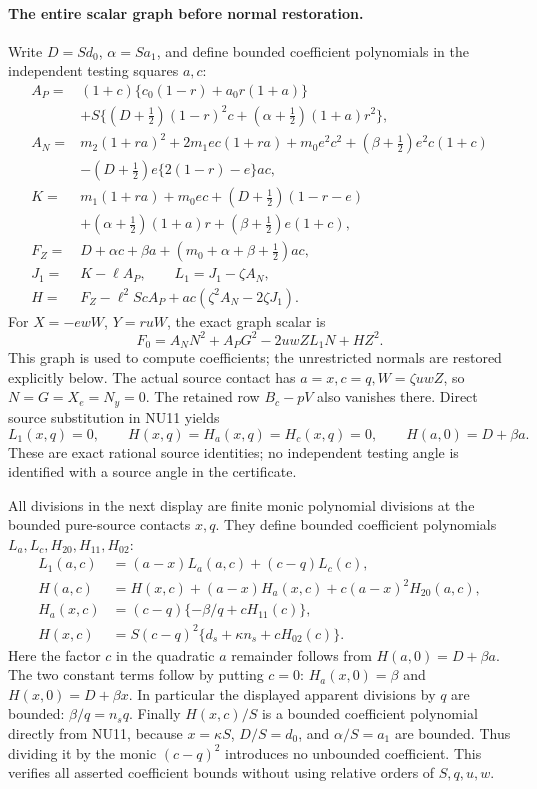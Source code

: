 \paragraph{The entire scalar graph before normal restoration.}
Write $D=Sd_0$, $\alpha=Sa_1$, and define bounded coefficient
polynomials in the independent testing squares $a,c$:
\[
\begin{split}
 A_P={}&(1+c)\{c_0(1-r)+a_0r(1+a)\}\\
 &+S\{(D+\tfrac12)(1-r)^2c
                  +(\alpha+\tfrac12)(1+a)r^2\},\\
 A_N={}&m_2(1+ra)^2+2m_1ec(1+ra)+m_0e^2c^2
                  +(\beta+\tfrac12)e^2c(1+c)\\
 &-(D+\tfrac12)e\{2(1-r)-e\}ac,\\
 K={}&m_1(1+ra)+m_0ec+(D+\tfrac12)(1-r-e)\\
 &+(\alpha+\tfrac12)(1+a)r+(\beta+\tfrac12)e(1+c),\\
 F_Z={}&D+\alpha c+\beta a+(m_0+\alpha+\beta+\tfrac12)ac,\\
 J_1={}&K-\ell A_P,\qquad L_1=J_1-\zeta A_N,\\
 H={}&F_Z-\ell^2ScA_P+ac(\zeta^2A_N-2\zeta J_1).
\end{split}\tag{NU11}
\]
For $X=-ewW$, $Y=ruW$, the exact graph scalar is
\[
 F_0=A_NN^2+A_PG^2-2uwZL_1N+HZ^2.
 \tag{NU12}
\]
This graph is used to compute coefficients; the unrestricted
normals are restored explicitly below. The actual source contact
has $a=x,c=q,W=\zeta uwZ$, so $N=G=X_e=N_y=0$.
The retained row $B_c-pV$ also vanishes there. Direct source
substitution in NU11 yields
\[
 L_1(x,q)=0,\qquad H(x,q)=H_a(x,q)=H_c(x,q)=0,
 \qquad H(a,0)=D+\beta a.
 \tag{NU13}
\]
These are exact rational source identities; no independent
testing angle is identified with a source angle in the certificate.

All divisions in the next display are finite monic polynomial
divisions at the bounded pure-source contacts $x,q$. They define
bounded coefficient polynomials $L_a,L_c,H_{20},H_{11},H_{02}$:
\[
\begin{split}
 L_1(a,c)&=(a-x)L_a(a,c)+(c-q)L_c(c),\\
 H(a,c)&=H(x,c)+(a-x)H_a(x,c)+c(a-x)^2H_{20}(a,c),\\
 H_a(x,c)&=(c-q)\{-\beta/q+cH_{11}(c)\},\\
 H(x,c)&=S(c-q)^2\{d_s+\kappa n_s+cH_{02}(c)\}.
\end{split}\tag{NU14}
\]
Here the factor $c$ in the quadratic $a$ remainder follows from
$H(a,0)=D+\beta a$. The two constant terms follow by putting
$c=0$: $H_a(x,0)=\beta$ and $H(x,0)=D+\beta x$.
In particular the displayed apparent divisions by $q$ are
bounded: $\beta/q=n_sq$. Finally $H(x,c)/S$ is a bounded
coefficient polynomial directly from NU11, because
$x=\kappa S$, $D/S=d_0$, and $\alpha/S=a_1$ are bounded.
Thus dividing it by the monic $(c-q)^2$ introduces no unbounded
coefficient. This verifies all asserted coefficient bounds without
using relative orders of $S,q,u,w$.

